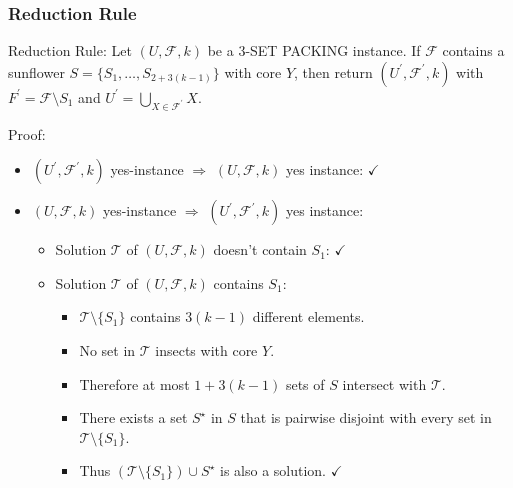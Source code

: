 \documentclass{beamer}
\begin{document}
\begin{frame}
    \frametitle{Reduction Rule}
    
    \begin{block}{Reduction Rule:}
        Let $(U, \mathcal{F}, k)$ be a 3-SET PACKING instance.
        If $\mathcal{F}$ contains a sunflower $S = \{S_1, \dots, S_{2 + 3(k - 1)}\}$ with core $Y$, then return $(U^{\prime}, \mathcal{F^{\prime}}, k)$ with $F^{\prime} = \mathcal{F} \setminus S_1$ and $U^{\prime} = \bigcup_{X \in \mathcal{F}^{\prime}} X$.
    \end{block}
    \pause

    \begin{block}{Proof:}
        \begin{itemize}
            \item $(U^{\prime}, \mathcal{F}^{\prime}, k)$ yes-instance $\Rightarrow$ $(U, \mathcal{F}, k)$ yes instance: $\checkmark$
            \pause
            \item $(U, \mathcal{F}, k)$ yes-instance $\Rightarrow$ $(U^{\prime}, \mathcal{F}^{\prime}, k)$ yes instance: \pause
                \begin{itemize}
                    \item Solution $\mathcal{T}$ of $(U, \mathcal{F}, k)$ doesn't contain $S_1$: $\checkmark$
                        \pause
                    \item Solution $\mathcal{T}$ of $(U, \mathcal{F}, k)$ contains $S_1$:
                        \pause
                        \begin{itemize}
                            \item $\mathcal{T} \setminus \{S_1\}$ contains $3 (k - 1)$ different elements. \pause
                            \item No set in $\mathcal{T}$ insects with core $Y$.
                            \pause{}
                            \item Therefore at most $1 + 3(k - 1)$ sets of $S$ intersect with $\mathcal{T}$.
                            \pause{}
                        \item There exists a set $S^{\star}$ in $S$ that is pairwise disjoint with every set in $\mathcal{T} \setminus \{S_1\}$.
                            \pause{}
                        \item Thus $(\mathcal{T} \setminus \{S_1\}) \cup S^{\star}$ is also a solution. $\checkmark$
                        \end{itemize}
                \end{itemize}
        \end{itemize}

    \end{block}
\end{frame}
\end{document}
